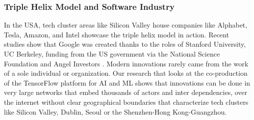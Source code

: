 \documentclass[CHICAGO,Times1COL]{WileyNJDv5} %
\begin{document}
\subsubsection{Triple Helix Model and Software Industry}

In the USA, tech cluster areas like Silicon Valley house companies like Alphabet, Tesla, Amazon, and Intel showcase the triple helix model in action. Recent studies show that Google was created thanks to the roles of Stanford University, UC Berkeley, funding from the US government via the National  Science Foundation and Angel Investors \citep{doi:10.1177/0539018413497833}.  Modern innovations rarely came from the work of a sole individual or organization. Our research that looks at the co-production of the TensorFlow platform for \ac{AI} and \ac{ML} shows that innovations can be done in very large networks that embed thousands of actors and inter dependencies, over the internet without clear geographical boundaries that characterize tech clusters like Silicon Valley, Dublin, Seoul or the Shenzhen-Hong Kong-Guangzhou.  
\end{document}
